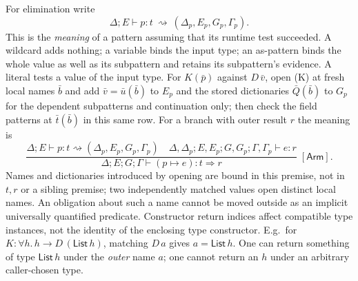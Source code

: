 \documentclass[11pt]{article}
\theoremstyle{definition}
\newcommand{\List}{\mathsf{List}}
\newcommand{\arr}{\mathbin{\to}}
\newcommand{\rrule}[3]{\frac{\displaystyle #2}{\displaystyle #3}
                       \;{\scriptstyle[\textsf{#1}]}}
\begin{document}
For elimination write
\[
       \Delta;E\vdash p:t\ \rightsquigarrow\ (\Delta_p,E_p,G_p,\Gamma_p).
\]
This is the \emph{meaning} of a pattern assuming that its runtime test
succeeded. A wildcard adds nothing; a variable binds the input type; an
as-pattern binds the whole value as well as its subpattern and retains its
subpattern's evidence. A literal tests a value of the input type. For
$K(\bar p)$ against $D\,\bar v$, open (K) at fresh local names $\bar b$
and add $\bar v=\bar u(\bar b)$ to $E_p$ and the stored dictionaries
$\bar Q(\bar b)$ to $G_p$ for the dependent subpatterns and continuation
only; then check the field patterns at $\bar t(\bar b)$ in this same row.
For a branch with outer result $r$ the meaning is
\[
 \rrule{Arm}{\Delta;E\vdash p:t\rightsquigarrow(\Delta_p,E_p,G_p,\Gamma_p)
          \quad \Delta,\Delta_p;E,E_p;G,G_p;\Gamma,\Gamma_p\vdash e:r}
      {\Delta;E;G;\Gamma\vdash (p\mapsto e):t\Rightarrow r}.
\]
Names and dictionaries introduced by opening are bound in this premise, not
in $t,r$ or a sibling premise; two independently matched values open
distinct local names. An obligation about such a name cannot be moved
outside as an implicit universally quantified predicate. Constructor return
indices affect compatible type instances, not the identity of the enclosing
type constructor. E.g.\ for $K:\forall h.\,h\arr D\,(\List\,h)$, matching
$D\,a$ gives $a=\List\,h$. One can return something of type $\List\,h$
under the \emph{outer} name $a$; one cannot return an $h$ under an
arbitrary caller-chosen type.
\end{document}
